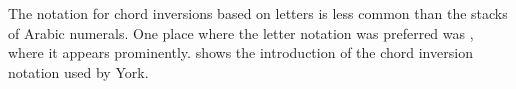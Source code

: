 

The notation for chord inversions based on letters is less
common than the stacks of Arabic numerals. One place where
the letter notation was preferred was
\textcite{york1909practical}, where it appears prominently.
 shows the
introduction of the chord inversion notation used by York.
